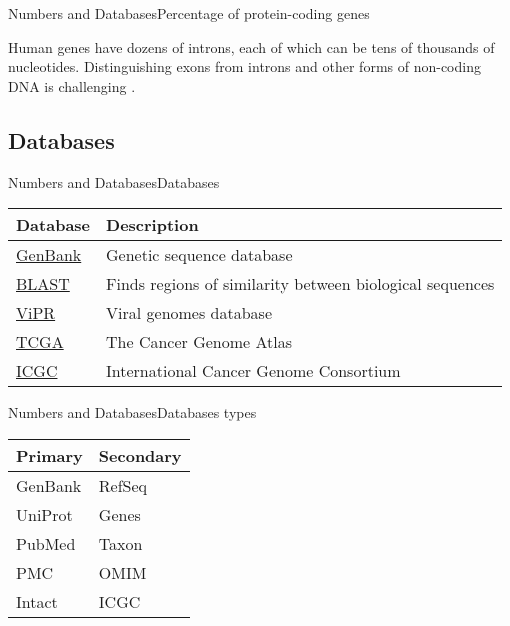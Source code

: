\documentclass[10pt]{beamer}
\begin{document}
{\begin{frame}{Numbers and Databases}{Percentage of protein-coding genes}
\begin{block}{}
\centering
Human genes have dozens of introns, each of which can be tens of thousands of nucleotides. Distinguishing exons from introns and other forms of non-coding DNA is challenging \cite{archibald2018genomics}.
\end{block}

\end{frame}

\subsection{Databases}

\begin{frame}{Numbers and Databases}{Databases}

\begin{tabular}{ll}
\textbf{Database} & \textbf{Description}                                                \\
\hline
\href{https://www.ncbi.nlm.nih.gov/genbank/}{GenBank}   & Genetic sequence database                                       \\
\href{https://blast.ncbi.nlm.nih.gov/Blast.cgi}{BLAST}    & Finds regions of similarity between biological sequences    \\
\href{https://www.viprbrc.org/}{ViPR}     & Viral genomes database                                                       \\
\href{https://www.cancer.gov/}{TCGA}     & The Cancer Genome Atlas                                                       \\
 \href{https://dcc.icgc.org/}{ICGC}     & International Cancer Genome Consortium                        \\      
\end{tabular}

\end{frame}


\begin{frame}{Numbers and Databases}{Databases types}
\centering
\begin{tabular}{ll}
\textbf{Primary} & \textbf{Secondary}                                \\
\hline
GenBank    & RefSeq    \\
UniProt    & Genes  \\
PubMed    & Taxon  \\
PMC    & OMIM  \\
Intact & ICGC \\
\end{tabular}


\end{frame}}
\end{document}
